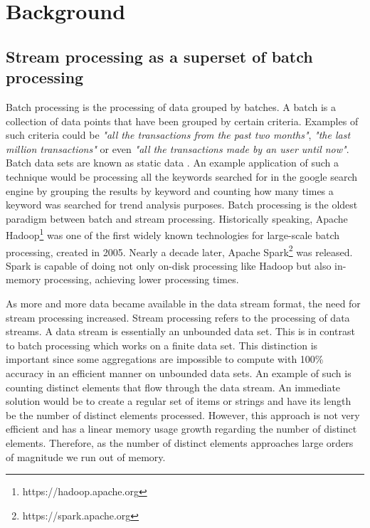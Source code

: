 \chapter{Background}\label{chap:background} \minitoc

\section{Stream processing as a superset of batch processing} \label{sec:stream-superset}

Batch processing is the processing of data grouped by batches. A batch is a collection of data points that have been grouped by certain criteria. Examples of such criteria could be \textit{"all the transactions from the past two months"}, \textit{"the last million transactions"} or even \textit{"all the transactions made by an user until now"}. Batch data sets are known as static data \cite{Martin-Batch-Defin}. An example application of such a technique would be processing all the keywords searched for in the google search engine by grouping the results by keyword and counting how many times a keyword was searched for trend analysis purposes. Batch processing is the oldest paradigm between batch and stream processing. Historically speaking, Apache Hadoop\footnote{https://hadoop.apache.org} was one of the first widely known technologies for large-scale batch processing, created in 2005. Nearly a decade later, Apache Spark\footnote{https://spark.apache.org} was released. Spark is capable of doing not only on-disk processing like Hadoop but also in-memory processing, achieving lower processing times. 

As more and more data became available in the data stream format, the need for stream processing increased. Stream processing refers to the processing of data streams. A data stream is essentially an unbounded data set. This is in contrast to batch processing which works on a finite data set. This distinction is important since some aggregations are impossible to compute with 100\% accuracy in an efficient manner on unbounded data sets. An example of such is counting distinct elements that flow through the data stream. An immediate solution would be to create a regular set of items or strings and have its length be the number of distinct elements processed. However, this approach is not very efficient and has a linear memory usage growth regarding the number of distinct elements. Therefore, as the number of distinct elements approaches large orders of magnitude we run out of memory.


